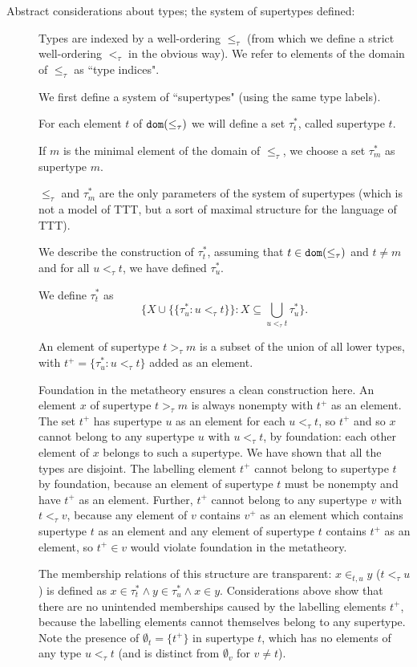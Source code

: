 \documentclass[112pt]{article}
\begin{document}
\begin{description}
\item[Abstract considerations about types; the system of supertypes defined:]  Types are indexed by a well-ordering $\leq_\tau$ (from which we define a strict well-ordering $<_\tau$ in the obvious way).
We refer to elements of the domain of $\leq_\tau$ as ``type indices".

We first define a system of ``supertypes" (using the same type labels).

For each element $t$ of ${\tt dom}(\leq_\tau)$ we will define a set $\tau^*_t$, called supertype $t$.

If $m$ is the minimal element of the domain of $\leq_\tau$, we choose a set $\tau^*_m$ as supertype $m$.

$\leq_\tau$ and $\tau^*_m$ are the only parameters of the system of supertypes (which is not a model of TTT, but a sort of maximal structure for the language of TTT).

We describe the construction of $\tau^*_t$, assuming that $t \in {\tt dom}(\leq_\tau)$ and $t \neq m$ and for all $u <_\tau t$, we have
defined $\tau^*_u$.

We define $\tau^*_t$ as $$\{X \cup \{\{\tau^*_u:u <_\tau t\}\}:X \subseteq \bigcup_{u <_\tau t}\tau^*_u\}.$$

An element of supertype $t>_\tau m$ is a subset of the union of all lower types, with $t^+ = \{\tau^*_u:u <_\tau t\}$ added as an element.

Foundation in the metatheory ensures a clean construction here.  An element $x$ of supertype $t>_\tau m$ is always nonempty with $t^+$ as an element.  The set $t^+$ has supertype $u$ as an element for each $u <_\tau t$, so $t^+$ and so $x$  cannot belong to any supertype $u$ with $u <_\tau t$, by foundation:  each other element of $x$ belongs to such a supertype.  We have shown that all the types are disjoint.  The labelling element $t^+$ cannot belong to supertype $t$ by foundation, because an element of supertype $t$ must be nonempty and have $t^+$ as an element.  Further, $t^+$ cannot belong to any supertype $v$ with $t <_\tau v$, because any element of $v$ contains $v^+$ as an element which contains supertype $t$ as an element and any element of supertype $t$ contains $t^+$ as an element, so $t^+ \in v$ would violate foundation in the metatheory.

The membership relations of this structure are transparent:  $x \in_{t,u} y$ ($t <_\tau u$) is defined as
$x \in \tau^*_t \wedge y \in \tau^*_u \wedge x \in y$.   Considerations above show that there are no unintended memberships caused by the labelling elements $t^+$, because the labelling elements cannot themselves belong to any supertype.  Note the presence of $\emptyset_t = \{t^+\}$ in supertype $t$, which has no elements of any type $u <_\tau t$ (and is distinct from $\emptyset_v$ for $v \neq t$).


\end{description}
\end{document}

